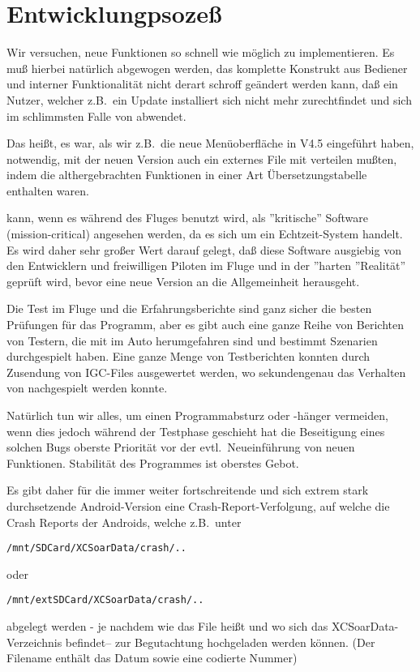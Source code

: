\section{Entwicklungpsozeß}

Wir versuchen, neue Funktionen so schnell wie möglich zu implementieren. Es muß hierbei natürlich abgewogen werden, das komplette Konstrukt
aus Bediener und interner Funktionalität nicht derart schroff geändert werden kann, daß ein Nutzer, welcher z.B.\ ein Update installiert sich nicht
mehr zurechtfindet und sich im schlimmsten Falle von \xc abwendet.

Das heißt, es war, als wir z.B.\ die neue Menüoberfläche in V4.5 eingeführt haben,  notwendig, mit der neuen Version  auch ein externes
File mit verteilen mußten, indem die althergebrachten Funktionen in einer Art Übersetzungstabelle enthalten waren.

\xc kann, wenn es während des Fluges benutzt wird, als ''kritische'' Software  (mission-critical) angesehen werden, da es sich um ein Echtzeit-System handelt.
Es wird daher sehr großer Wert darauf gelegt, daß diese Software ausgiebig von den Entwicklern und  freiwilligen Piloten im Fluge und in der ''harten ''Realität'' geprüft wird,
bevor eine neue Version an die Allgemeinheit herausgeht.

Die Test im Fluge und die Erfahrungsberichte sind ganz sicher die besten  Prüfungen für das Programm, aber es gibt auch eine ganze Reihe
von Berichten von Testern, die mit \xc im Auto herumgefahren sind und bestimmt Szenarien durchgespielt haben.  Eine ganze Menge von
Testberichten konnten durch Zusendung von  IGC-Files ausgewertet werden, wo sekundengenau das Verhalten von \xc nachgespielt werden konnte.

Natürlich tun wir alles, um einen Programmabsturz oder -hänger vermeiden, wenn dies jedoch während der Testphase geschieht hat die Beseitigung eines solchen
Bugs oberste Priorität vor der evtl.\  Neueinführung von neuen Funktionen.
Stabilität des Programmes ist oberstes Gebot.


Es gibt daher für die immer weiter fortschreitende und sich extrem stark durchsetzende Android-Version eine Crash-Report-Verfolgung,
auf welche die Crash Reports der Androids, welche z.B.\  unter
\begin{tabbing}
{\small\texttt{/mnt/SDCard/XCSoarData/crash/..}}\\
\qquad{}
\end{tabbing}
oder
\begin{tabbing}
{\small\texttt{/mnt/extSDCard/XCSoarData/crash/..}}\\
\qquad{}
\end{tabbing}
abgelegt werden - je nachdem wie das File heißt und wo sich das XCSoarData-Verzeichnis befindet--
zur Begutachtung hochgeladen werden können. (Der Filename enthält das Datum sowie eine codierte Nummer)


